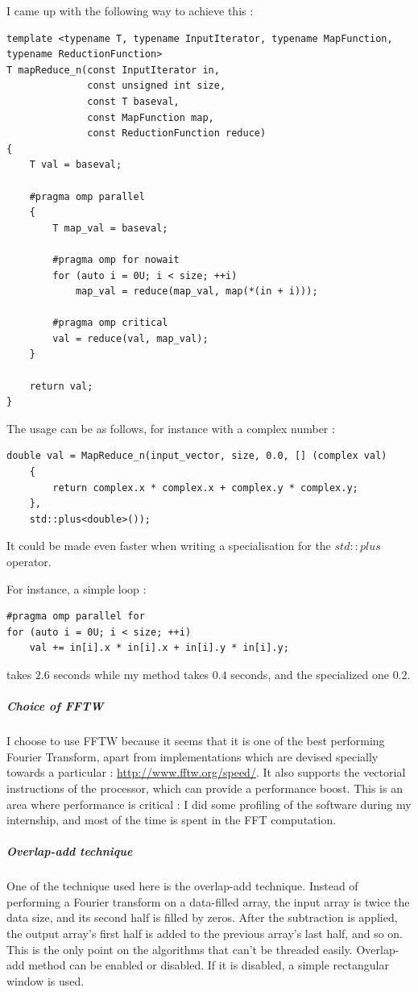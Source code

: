 I came up with the following way to achieve this : 
\begin{lstlisting}[caption=math\_util.cpp]
template <typename T, typename InputIterator, typename MapFunction, typename ReductionFunction>
T mapReduce_n(const InputIterator in,
			  const unsigned int size,
			  const T baseval,
			  const MapFunction map,
			  const ReductionFunction reduce)
{
	T val = baseval;

	#pragma omp parallel
	{
		T map_val = baseval;

		#pragma omp for nowait
		for (auto i = 0U; i < size; ++i)
			map_val = reduce(map_val, map(*(in + i)));

		#pragma omp critical
		val = reduce(val, map_val);
	}

	return val;
}
\end{lstlisting}
\newpage
The usage can be as follows, for instance with a complex number : 
\begin{lstlisting}
double val = MapReduce_n(input_vector, size, 0.0, [] (complex val)
    {
        return complex.x * complex.x + complex.y * complex.y;
    }, 
    std::plus<double>());
\end{lstlisting}

It could be made even faster when writing a specialisation for the $std::plus$ operator.

For instance, a simple loop :
\begin{lstlisting}
#pragma omp parallel for
for (auto i = 0U; i < size; ++i)
    val += in[i].x * in[i].x + in[i].y * in[i].y;
\end{lstlisting} 
takes $2.6$ seconds while my method takes $0.4$ seconds, and the specialized one $0.2$.

\subparagraph{Choice of \ac{FFTW}} I choose to use \ac{FFTW} because it seems that it is one of the best performing Fourier Transform, apart from implementations which are devised specially towards a particular : \url{http://www.fftw.org/speed/}.
It also supports the  vectorial instructions of the  processor, which can provide a performance boost.
This is an area where performance is critical : I did some profiling of the software during my internship, and most of the time is spent in the \ac{FFT} computation.
\subparagraph{Overlap-add technique}
One of the technique used here is the overlap-add technique. Instead of performing a Fourier transform on a data-filled array, the input array is twice the data size, and its second half is filled by zeros.
After the subtraction is applied, the output array's first half is added to the previous array's last half, and so on. This is the only point on the algorithms that can't be threaded easily.
Overlap-add method can be enabled or disabled. If it is disabled, a simple rectangular window is used.

